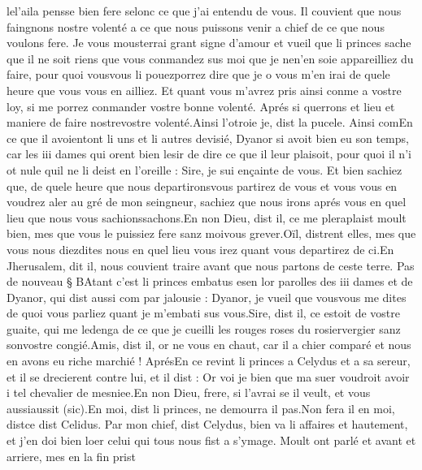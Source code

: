 \documentclass{article}
\begin{document}
\begin{pages}
      lel'aila pensse
      bien fere selonc ce que j’ai entendu de vous. 
   Il couvient que nous faingnons nostre volenté a ce que nous puissons venir a chief de ce que nous voulons fere. 
   Je vous mousterrai grant signe d’amour et vueil que li princes sache que il ne soit riens 
      que vous conmandez sus moi que je nen'en soie appareilliez du faire, 
      pour quoi vousvous li 
      pouezporrez dire que je o vous 
      m’en irai de quele heure que vous 
      vous en ailliez. 
      Et quant vous m’avrez pris ainsi conme a vostre loy, si me porrez conmander vostre bonne volenté. 
      Aprés si querrons et lieu et maniere de faire nostrevostre volenté.Ainsi l’otroie je, dist la pucele. \pend
\pstart Ainsi comEn ce que il 
   avoientont li uns et li autres 
   devisié, Dyanor si avoit bien eu son temps, car 
   les iii dames qui orent bien lesir de dire ce que il leur plaisoit, 
   pour quoi il n’i ot nule quil ne li deist en l’oreille :
   Sire, je sui ençainte de vous. Et bien sachiez que, de quele heure que 
      nous departironsvous partirez de 
      vous et vous vous en voudrez aler au gré de 
      mon seingneur, sachiez 
      que nous irons aprés vous en quel lieu que nous vous sachionssachons.En non Dieu, dist il, ce me pleraplaist 
      moult bien, mes que vous le puissiez fere sanz moivous grever.Oïl, distrent elles, mes 
      que vous nous diezdites nous en quel lieu vous irez quant vous 
      departirez de ci.En Jherusalem, dit il, 
      nous couvient traire avant que nous partons de ceste terre. \pend
\pstart Pas de nouveau § BAtant c’est 
   li princes embatus esen lor parolles 
   des iii dames et de Dyanor, 
   qui dist aussi com par jalousie :
   Dyanor, je vueil que 
      vousvous me dites de quoi vous parliez quant je m’embati sus
      vous.Sire, dist il, ce estoit de vostre guaite, qui me ledenga 
      de ce que je cueilli les rouges roses du 
      rosiervergier sanz 
      sonvostre congié.Amis, dist il, or ne vous en chaut, 
      car il a chier comparé et nous en avons eu riche marchié !
   AprésEn ce revint li princes a 
   Celydus et a sa sereur, et il se drecierent contre lui, 
   et il dist :
   Or voi je bien que ma suer 
      voudroit avoir i tel chevalier de mesniee.En non Dieu, frere, si l’avrai se il veult, et vous 
      aussiaussit (sic).En moi, dist li princes, ne demourra il pas.Non fera il en moi, distce dist 
   Celidus. \pend
\pstart Par mon chief, dist Celydus, 
   bien va li affaires et hautement, et j’en doi bien loer celui qui tous nous fist a s’ymage.
   Moult ont parlé et avant et arriere, mes en la fin prist 

\end{pages}
\end{document}
